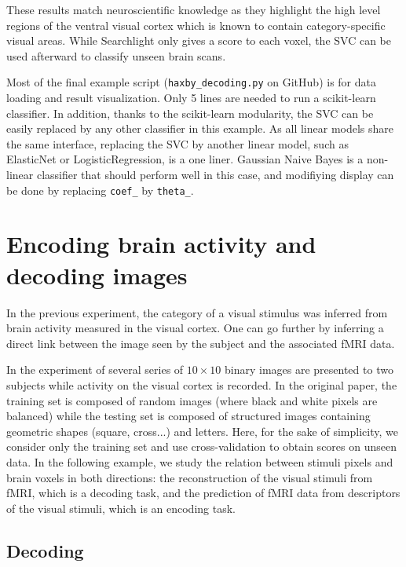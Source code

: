 \documentclass{frontiersSCNS} %
\begin{document}
These results match neuroscientific knowledge as they highlight the
high level regions of the ventral visual cortex which is known to
contain category-specific visual areas. While Searchlight only gives a
score to each voxel, the SVC can be used afterward to classify unseen
brain scans.

Most of the final example script (\texttt{haxby\_decoding.py} on GitHub) is
for data
loading and result visualization. Only 5 lines are needed to run a scikit-learn
classifier. In addition, thanks to the scikit-learn modularity, the SVC can be easily
replaced by any other classifier in this example. As all linear models share the
same interface, replacing the SVC by another linear model, such as ElasticNet
or LogisticRegression, is a one liner. Gaussian Naive Bayes is a non-linear
classifier that should perform well in this case, and modifiying display can be
done by replacing \texttt{coef_} by \texttt{theta_}.


\section{Encoding brain activity and decoding images}
\label{kamitani}

In the previous experiment, the category of a visual stimulus was inferred from
brain activity measured in the visual cortex.
One can go further by inferring a direct link between the image
seen by the subject and the associated fMRI data.

In the experiment of \cite{miyawaki2008} several series of $10{\times}10$
binary images are presented to two subjects while activity on the visual cortex
is recorded.
In the original paper, the training set is composed of random images (where black and white pixels
are balanced) while the testing set is composed of structured images containing
geometric shapes (square, cross...) and letters. Here, for the sake of simplicity, we consider only the training set and use cross-validation to
obtain scores on unseen data.
%
In the following example, we study the relation between stimuli pixels and
brain voxels in both directions: the reconstruction of the visual stimuli
from fMRI, which is a decoding task, and the prediction of fMRI data
from descriptors of the visual stimuli, which is an encoding task.

\subsection{Decoding}
\end{document}

